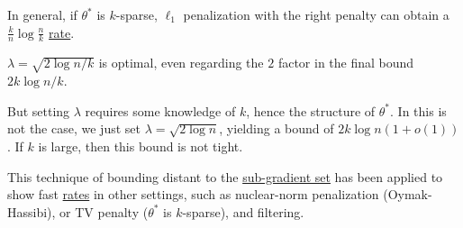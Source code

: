\begin{note}
	In general, if \(\theta ^{\ast} \) is \(k\)-sparse, \(\ell _1\) penalization with the right penalty can obtain a \(\frac{k}{n} \log \frac{n}{k}\) \hyperref[def:rate-of-convergence]{rate}.
\end{note}

\begin{remark}
	\(\lambda = \sqrt{2 \log n / k} \) is optimal, even regarding the \(2\) factor in the final bound \(2k \log n / k\).
\end{remark}

But setting \(\lambda \) requires some knowledge of \(k\), hence the structure of \(\theta ^{\ast} \). In this is not the case, we just set \(\lambda = \sqrt{2 \log n} \), yielding a bound of \(2 k \log n (1 + o(1))\). If \(k\) is large, then this bound is not tight.

\begin{note}
	This technique of bounding distant to the \hyperref[def:sub-gradient]{sub-gradient set} has been applied to show fast \hyperref[def:rate-of-convergence]{rates} in other settings, such as nuclear-norm penalization (Oymak-Hassibi), or TV penalty (\(\theta ^{\ast} \) is \(k\)-sparse), and filtering.
\end{note}